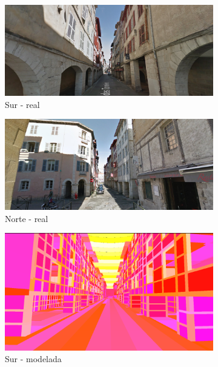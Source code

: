 \begin{figure}[htbp]
	\centering
	\begin{subfigure}{0.475\textwidth}
		\includegraphics[width=1\linewidth]{assets/streetreal1}
		\caption{Sur - real}
	\end{subfigure}
	\begin{subfigure}{0.475\textwidth}
		\includegraphics[width=1\linewidth]{assets/streetreal2}
		\caption{Norte - real}
	\end{subfigure}
	\begin{subfigure}{0.475\textwidth}
		\includegraphics[width=1\linewidth]{assets/streetmodel1}
		\caption{Sur - modelada}
	\end{subfigure}
	\begin{subfigure}{0.475\textwidth}

\end{subfigure}
\end{figure}
